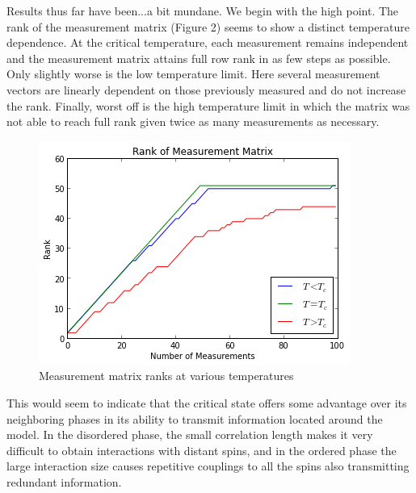 \documentclass{article} %
\begin{document}
Results thus far have been...a bit mundane.  We begin with the high point.  The
rank of the measurement matrix (Figure 2) seems to show a distinct temperature dependence.
At the critical temperature, each measurement remains independent and the
measurement matrix attains full row rank in as few steps as possible.  Only
slightly worse is the low temperature limit.  Here several measurement vectors are
linearly dependent on those previously measured and do not increase the rank.
Finally, worst off is the high temperature limit in which the matrix was not able
to reach full rank given twice as many measurements as necessary.
\begin{figure}[h]
\begin{center}
\includegraphics[width=0.5\linewidth]{Ranks.png}
\end{center}
\caption{Measurement matrix ranks at various temperatures}
\end{figure}
This would seem to indicate that the critical state offers some advantage over its
neighboring phases in its ability to transmit information located around the model.
In the disordered phase, the small correlation length makes it very difficult to
obtain interactions with distant spins, and in the ordered phase the large interaction
size causes repetitive couplings to all the spins also transmitting redundant information.
\end{document}
